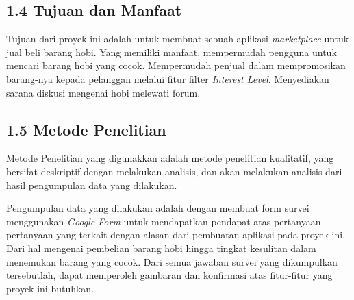 \documentclass[a4paper]{article}
\begin{document}
\subsection*{1.4 Tujuan dan Manfaat}

Tujuan dari proyek ini adalah untuk membuat sebuah aplikasi \textit{marketplace} untuk jual beli barang hobi. Yang memiliki manfaat, mempermudah pengguna untuk mencari barang hobi yang cocok. Mempermudah penjual dalam mempromosikan barang-nya kepada pelanggan melalui fitur filter \textit{Interest Level}. Menyediakan sarana diskusi mengenai hobi melewati forum.

\subsection*{1.5 Metode Penelitian}

Metode Penelitian yang digunakkan adalah metode penelitian kualitatif, yang bersifat deskriptif dengan melakukan analisis\autocite{pengajar-kualitatif}, dan akan melakukan analisis dari hasil pengumpulan data yang dilakukan.


Pengumpulan data yang dilakukan adalah dengan membuat form survei menggunakan \textit{Google Form} untuk mendapatkan pendapat atas pertanyaan-pertanyaan yang terkait dengan alasan dari pembuatan aplikasi pada proyek ini. Dari hal mengenai pembelian barang hobi hingga tingkat kesulitan dalam menemukan barang yang cocok. Dari semua jawaban survei yang dikumpulkan tersebutlah, dapat memperoleh gambaran dan konfirmasi atas fitur-fitur yang proyek ini butuhkan. 
\end{document}
